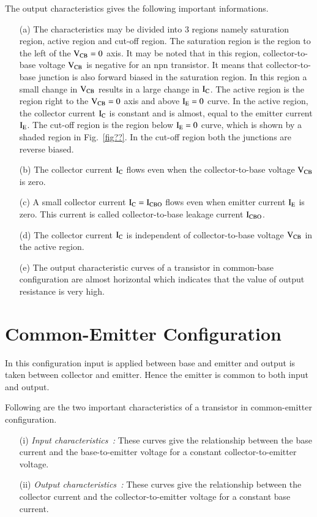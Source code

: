 The output characteristics gives the following important informations.
\begin{itemize}
\item[(a)] The characteristics may be divided into 3 regions namely saturation region, active region and cut-off region. The saturation region is the region to the left of the $\textrm{V}_{\text{CB}}=0$ axis. It may be noted that in this region, collector-to-base voltage $\textrm{V}_{\text{CB}}$ is negative for an npn transistor. It means that collector-to-base junction is also forward biased in the saturation region. In this region a small change in $\textrm{V}_{\text{CB}}$ results in a large change in $\textrm{I}_{\textrm{C}}$. The active region is the region right to the $\textrm{V}_{\text{CB}}=0$ axis and above $\textrm{I}_{\textrm{E}}=0$ curve. In the active region, the collector current $\textrm{I}_{\textrm{C}}$ is constant and is almost, equal to the emitter current $\textrm{I}_{\textrm{E}}$. The cut-off region is the region below $\textrm{I}_{\textrm{E}}=0$ curve, which is shown by a shaded region in Fig.~\ref{fig??}. In the cut-off region both the junctions are reverse biased.

\item[(b)] The collector current $\textrm{I}_{\textrm{C}}$ flows even when the collector-to-base voltage $\textrm{V}_{\text{CB}}$ is zero.

\item[(c)] A small collector current $\textrm{I}_{\textrm{C}}=\textrm{I}_{\text{CBO}}$ flows even when emitter current $\textrm{I}_{\textrm{E}}$ is zero. This current is called collector-to-base leakage current $\textrm{I}_{\text{CBO}}$.

\item[(d)] The collector current $\textrm{I}_{\textrm{C}}$ is independent of collector-to-base voltage $\textrm{V}_{\text{CB}}$ in the active region.

\item[(e)] The output characteristic curves of a transistor in common-base configuration are almost horizontal which indicates that the value of output resistance is very high.
\end{itemize}

\section{Common-Emitter Configuration}\label{sec2.5}

In this configuration input is applied between base and emitter and output is taken between collector and emitter. Hence the emitter is common to both input and output.

 Following are the two important characteristics of a transistor in common-emitter configuration.
\begin{itemize}
\item[(i)] {\em Input characteristics~:} These curves give the relationship between the base current and the base-to-emitter voltage for a constant collector-to-emitter voltage.

\item[(ii)] {\em Output characteristics~:} These curves give the relationship between the collector current and the collector-to-emitter voltage for a constant base current.
\end{itemize}

